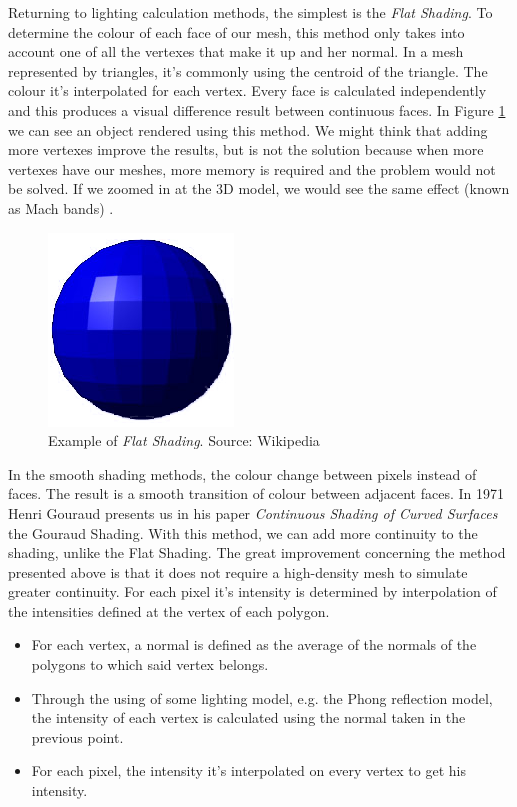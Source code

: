 \documentclass[titlepage,12pt]{article}
\begin{document}
Returning to lighting calculation methods, the simplest is the \textit{Flat Shading}. To determine the colour of each face of our mesh, this method only takes into account one of all the vertexes that make it up and her normal. In a mesh represented by triangles, it's commonly using the centroid of the triangle. The colour it's interpolated for each vertex. Every face is calculated independently and this produces a visual difference result between continuous faces. In Figure \ref{flat:shading} we can see an object rendered using this method. We might think that adding more vertexes improve the results, but is not the solution because when more vertexes have our meshes, more memory is required and the problem would not be solved. If we zoomed in at the 3D model, we would see the same effect (known as Mach bands) \citep{Lotto1999}.

\begin{figure}[H]
	\centering
	\includegraphics[scale=0.5]{media/Flat-shading-sample.png}
	\caption{Example of \textit{Flat Shading}. Source: Wikipedia}
	\label{flat:shading}
\end{figure}

In the smooth shading methods, the colour change between pixels instead of faces. The result is a smooth transition of colour between adjacent faces.
In 1971 Henri Gouraud presents us in his paper \textit{Continuous Shading of Curved Surfaces} \citep{Henri1971} the Gouraud Shading. With this method, we can add more continuity to the shading, unlike the Flat Shading. The great improvement concerning the method presented above is that it does not require a high-density mesh to simulate greater continuity. For each pixel it's intensity is determined by interpolation of the intensities defined at the vertex of each polygon.

\begin{itemize}
	\item For each vertex, a normal is defined as the average of the normals of the polygons to which said vertex belongs.
	\item Through the using of some lighting model,  e.g. the Phong reflection model, the intensity of each vertex is calculated using the normal taken in the previous point.
	\item For each pixel, the intensity it's interpolated on every vertex to get his intensity.
\end{itemize} 
\end{document}
